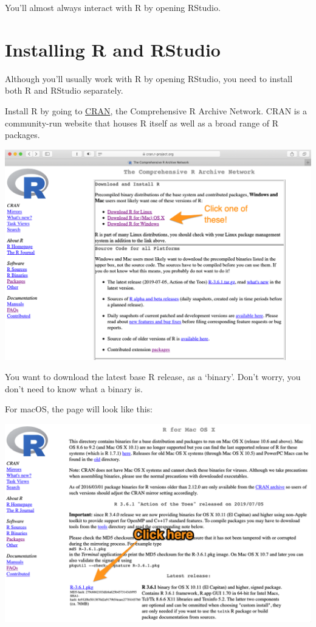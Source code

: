 \documentclass[
]{book}
\begin{document}
You'll almost always interact with R by opening RStudio.

\hypertarget{installing-r-and-rstudio}{%
\section{Installing R and RStudio}\label{installing-r-and-rstudio}}

Although you'll usually work with R by opening RStudio, you need to install both R and RStudio separately.

Install R by going to \href{https://cran.r-project.org}{CRAN}, the Comprehensive R Archive Network. CRAN is a community-run website that houses R itself as well as a broad range of R packages.

\includegraphics[width=15.69in]{atlas/r_cran}

You want to download the latest base R release, as a `binary'. Don't worry, you don't need to know what a binary is.

For macOS, the page will look like this:

\includegraphics[width=15.68in]{atlas/r_cran_macos}
\end{document}

